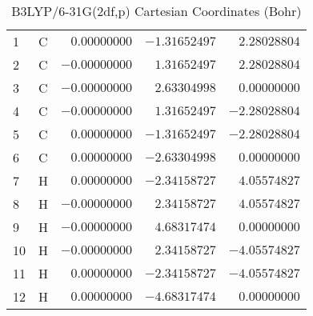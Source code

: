 \documentclass[10pt,oneside]{article}
\begin{document}
\begin{table}[h]
\centering
\caption{B3LYP/6-31G(2df,p) Cartesian Coordinates (Bohr)}
\begin{tabular}{llrrr}
\toprule
1  & C  & $ 0.00000000$ & $-1.31652497$ & $ 2.28028804$ \\
2  & C  & $-0.00000000$ & $ 1.31652497$ & $ 2.28028804$ \\
3  & C  & $-0.00000000$ & $ 2.63304998$ & $ 0.00000000$ \\
4  & C  & $-0.00000000$ & $ 1.31652497$ & $-2.28028804$ \\
5  & C  & $ 0.00000000$ & $-1.31652497$ & $-2.28028804$ \\
6  & C  & $ 0.00000000$ & $-2.63304998$ & $ 0.00000000$ \\
7  & H  & $ 0.00000000$ & $-2.34158727$ & $ 4.05574827$ \\
8  & H  & $-0.00000000$ & $ 2.34158727$ & $ 4.05574827$ \\
9  & H  & $-0.00000000$ & $ 4.68317474$ & $ 0.00000000$ \\
10 & H  & $-0.00000000$ & $ 2.34158727$ & $-4.05574827$ \\
11 & H  & $ 0.00000000$ & $-2.34158727$ & $-4.05574827$ \\
12 & H  & $ 0.00000000$ & $-4.68317474$ & $ 0.00000000$ \\
\bottomrule
\end{tabular}
\end{table}
\end{document}
